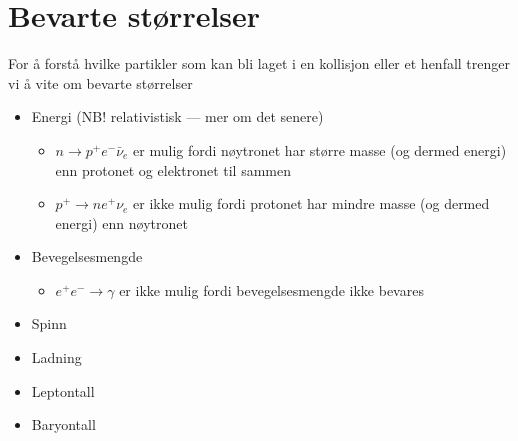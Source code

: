 \documentclass[a4paper,norsk,12pt]{article}
\begin{document}
\section*{Bevarte størrelser}
For å forstå hvilke partikler som kan bli laget i en kollisjon eller et henfall trenger vi å vite om bevarte størrelser
\begin{itemize}
\item Energi (NB! relativistisk --- mer om det senere)
	\begin{itemize}
	\item $n \to p^+e^-\bar{\nu}_e$ er mulig fordi nøytronet har større masse (og dermed energi) enn protonet og elektronet til sammen
	\item $p^+ \to n e^+ \nu_e$ er ikke mulig fordi protonet har mindre masse (og dermed energi) enn nøytronet
	\end{itemize}
\item Bevegelsesmengde
	\begin{itemize}
	\item $e^+e^-\to \gamma$ er ikke mulig fordi bevegelsesmengde ikke bevares
	\end{itemize}
\item Spinn
\item Ladning
\item Leptontall
\item Baryontall
\end{itemize}
\end{document}
